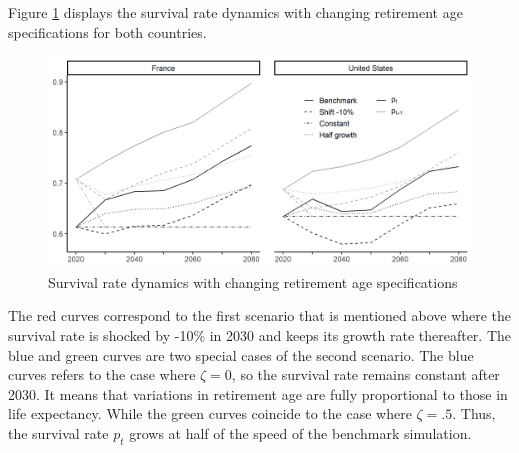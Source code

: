Figure \ref{fig:retage_p} displays the survival rate dynamics with changing retirement age specifications for both countries.
\begin{figure}[tb]
	\centering
	\includegraphics[width=1\linewidth]{../result/retirement/retage_p.png}
	\caption{Survival rate dynamics with changing retirement age specifications}
	\label{fig:retage_p}
\end{figure}
The red curves correspond to the first scenario that is mentioned above where the survival rate is shocked by -10\% in 2030 and keeps its growth rate thereafter. The blue and green curves are two special cases of the second scenario. The blue curves refers to the case where $\zeta = 0$, so the survival rate remains constant after 2030. It means that variations in retirement age are fully proportional to those in life expectancy. While the green curves coincide to the case where $\zeta = .5$. Thus, the survival rate $p_t$ grows at half of the speed of the benchmark simulation.

